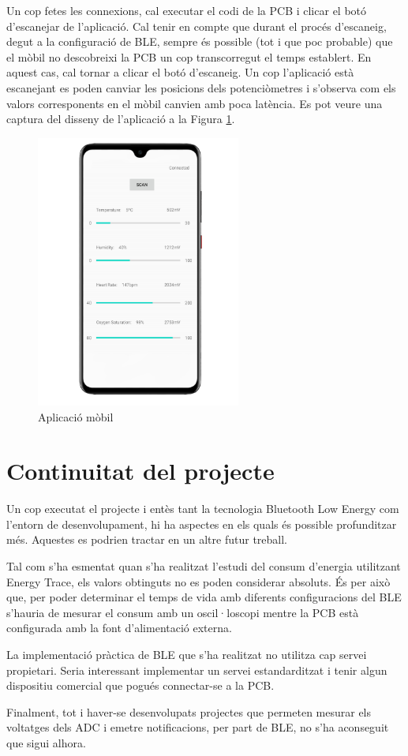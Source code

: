 Un cop fetes les connexions, cal executar el codi de la PCB i clicar el botó d'escanejar de l'aplicació.
Cal tenir en compte que durant el procés d'escaneig, degut a la configuració de BLE, sempre és possible (tot i que poc probable) que el mòbil no descobreixi la PCB un cop transcorregut el temps establert.
En aquest cas, cal tornar a clicar el botó d'escaneig.
Un cop l'aplicació està escanejant es poden canviar les posicions dels potenciòmetres i s'observa com els valors corresponents en el mòbil canvien amb poca latència.
Es pot veure una captura del disseny de l'aplicació a la Figura \ref{captura_app}.

\begin{figure}[h!]
	\begin{center}
		\includegraphics[width=0.6\textwidth]{./images/captura_app_borde.png}
		\caption{Aplicació mòbil}
		\label{captura_app}
	\end{center}
\end{figure}

\section{Continuitat del projecte}
Un cop executat el projecte i entès tant la tecnologia Bluetooth Low Energy com l'entorn de desenvolupament, hi ha aspectes en els quals és possible profunditzar més.
Aquestes es podrien tractar en un altre futur treball.

Tal com s'ha esmentat quan s'ha realitzat l'estudi del consum d'energia utilitzant Energy Trace, els valors obtinguts no es poden considerar absoluts.
És per això que, per poder determinar el temps de vida amb diferents configuracions del BLE s'hauria de mesurar el consum amb un oscil·loscopi mentre la PCB està configurada amb la font d'alimentació externa.

La implementació pràctica de BLE que s'ha realitzat no utilitza cap servei propietari.
Seria interessant implementar un servei estandarditzat i tenir algun dispositiu comercial que pogués connectar-se a la PCB.

Finalment, tot i haver-se desenvolupats projectes que permeten mesurar els voltatges dels ADC i emetre notificacions, per part de BLE, no s'ha aconseguit que sigui alhora.

